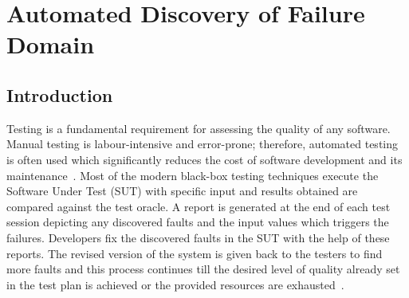 
\chapter{Automated Discovery of Failure Domain}
\label{chap:ADFD}

\section{Introduction}\label{sec:intro5}
Testing is a fundamental requirement for assessing the quality of any software. Manual testing is labour-intensive and error-prone; therefore, automated testing is often used which significantly reduces the cost of software development and its maintenance~\cite{beizer1995black}. Most of the modern black-box testing techniques execute the Software Under Test (SUT) with specific input and results obtained are compared against the test oracle. A report is generated at the end of each test session depicting any discovered faults and the input values which triggers the failures. Developers fix the discovered faults in the SUT with the help of these reports. The revised version of the system is given back to the testers to find more faults and this process continues till the desired level of quality already set in the test plan is achieved or the provided resources are exhausted~\cite{parnin2011automated}.


